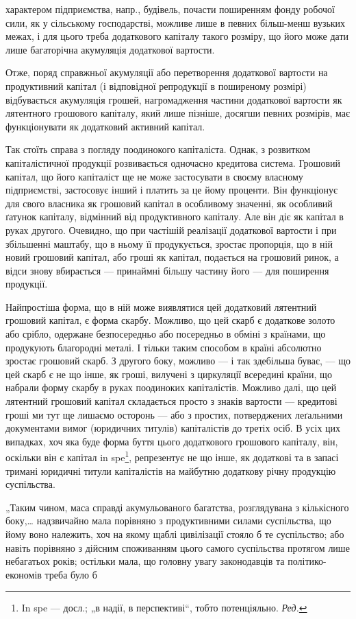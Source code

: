 \parcont{}  %
характером підприємства, напр., будівель, почасти поширенням фонду
робочої сили, як у сільському господарстві, можливе лише в певних
більш-менш вузьких межах, і для цього треба додаткового капіталу
такого розміру, що його може дати лише багаторічна акумуляція додаткової
вартости.

Отже, поряд справжньої акумуляції або перетворення додаткової
вартости на продуктивний капітал (і відповідної репродукції в поширеному
розмірі) відбувається акумуляція грошей, нагромадження частини додаткової
вартости як лятентного грошового капіталу, який лише пізніше,
досягши певних розмірів, має функціонувати як додатковий активний
капітал.

Так стоїть справа з погляду поодинокого капіталіста. Однак, з розвитком
капіталістичної продукції розвивається одночасно кредитова система.
Грошовий капітал, що його капіталіст ще не може застосувати в своєму
власному підприємстві, застосовує інший і платить за це йому проценти. Він
функціонує для свого власника як грошовий капітал в особливому
значенні, як особливий ґатунок капіталу, відмінний від продуктивного
капіталу. Але він діє як капітал в руках другого. Очевидно, що при
частішій реалізації додаткової вартости і при збільшенні маштабу, що
в ньому її продукується, зростає пропорція, що в ній новий грошовий
капітал, або гроші як капітал, подається на грошовий ринок, а відси
знову вбирається — принаймні більшу частину його — для поширення
продукції.

Найпростіша форма, що в ній може виявлятися цей додатковий лятентний
грошовий капітал, є форма скарбу. Можливо, що цей скарб є
додаткове золото або срібло, одержане безпосередньо або посередньо
в обміні з країнами, що продукують благородні металі. І тільки таким
способом в країні абсолютно зростає грошовий скарб. З другого боку,
можливо — і так здебільша буває, — що цей скарб є не що інше, як
гроші, вилучені з циркуляції всередині країни, що набрали форму скарбу
в руках поодиноких капіталістів. Можливо далі, що цей лятентний грошовий
капітал складається просто з знаків вартости — кредитові гроші
ми тут ще лишаємо осторонь — або з простих, потверджених леґальними
документами вимог (юридичних титулів) капіталістів до третіх осіб. В
усіх цих випадках, хоч яка буде форма буття цього додаткового грошового
капіталу, він, оскільки він є капітал in spe\footnote*{
In spe — досл.; „в надії, в перспективі“, тобто потенціяльно. \emph{Ред.}
}, репрезентує не
що інше, як додаткові та в запасі тримані юридичні титули капіталістів на
майбутню додаткову річну продукцію суспільства.

„Таким чином, маса справді акумульованого багатства, розглядувана
з кількісного боку,\dots{} надзвичайно мала порівняно з продуктивними
силами суспільства, що йому воно належить, хоч на якому щаблі цивілізації
стояло б те суспільство; або навіть порівняно з дійсним споживанням
цього самого суспільства протягом лише небагатьох років; остільки
мала, що головну увагу законодавців та політико-економів треба було б
\parbreak{}  %
